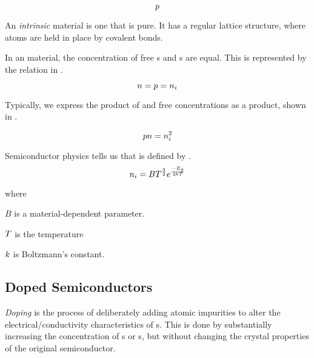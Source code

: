 \begin{equation}\label{eq:Concentration_Holes}
  p
\end{equation}

\begin{definition}[Intrinsic]\label{def:Intrinsic}
  An \emph{intrinsic} material is one that is pure.
  It has a regular lattice structure, where atoms are held in place by covalent bonds.
\end{definition}

In an  material, the concentration of free s and s are equal.
This is represented by the relation in .

\begin{equation}\label{eq:Electron_Hole_Concentration-Intrinsic}
  n = p = n_{i}
\end{equation}

Typically, we express the product of  and free  concentrations as a product, shown in .

\begin{equation}\label{eq:Electron_Hole_Concentration}
  p n = n_{i}^{2}
\end{equation}

Semiconductor physics tells us that \HoleElectronConcentration{} is defined by .
\begin{equation}\label{eq:Hole_Electron_Concentration}
  n_{i} = B T^{\frac{3}{2}} e^{\frac{-E_{g}}{2 k T}}
\end{equation}

where
\begin{description}[noitemsep]
\item $B$ is a material-dependent parameter.
\item $T$ is the temperature
\item $k$ is Boltzmann's constant.
\end{description}

\subsection{Doped Semiconductors}\label{subsec:Doped_Semiconductors}
\begin{definition}[Doping]\label{def:Doping}
  \emph{Doping} is the process of deliberately adding atomic impurities to alter the electrical/conductivity characteristics of s.
  This is done by substantially increasing the concentration of s or s, but without changing the crystal properties of the original semiconductor.
\end{definition}



